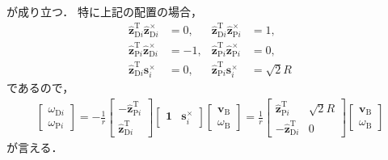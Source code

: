 ﻿\documentclass[a4paper]{jsarticle}
\begin{document}
が成り立つ．
特に上記の配置の場合，
\begin{align*}
\hat{\bm{z}}_{\mathrm{D}i}^{\mathrm{T}}\hat{\bm{z}}_{\mathrm{D}i}^{\times}&=0, &
\hat{\bm{z}}_{\mathrm{D}i}^{\mathrm{T}}\hat{\bm{z}}_{\mathrm{P}i}^{\times}&=1,
\\
\hat{\bm{z}}_{\mathrm{P}i}^{\mathrm{T}}\hat{\bm{z}}_{\mathrm{D}i}^{\times}&=-1, &
\hat{\bm{z}}_{\mathrm{P}i}^{\mathrm{T}}\hat{\bm{z}}_{\mathrm{P}i}^{\times}&=0,
\\
\hat{\bm{z}}_{\mathrm{D}i}^{\mathrm{T}}\bm{s}_{i}^{\times}&=0, &
\hat{\bm{z}}_{\mathrm{P}i}^{\mathrm{T}}\bm{s}_{i}^{\times}&=\sqrt{2}R
\end{align*}
であるので，
\begin{align*}
\begin{bmatrix}
 \omega_{\mathrm{D}i} \\ \omega_{\mathrm{P}i}
\end{bmatrix}
=
-\frac{1}{r}
\begin{bmatrix}
-\hat{\bm{z}}_{\mathrm{P}i}^{\mathrm{T}} \\
 \hat{\bm{z}}_{\mathrm{D}i}^{\mathrm{T}}
\end{bmatrix}
\begin{bmatrix}
 \bm{1} & \bm{s}_{i}^{\times}
\end{bmatrix}
\begin{bmatrix}
 \bm{v}_{\mathrm{B}} \\ \omega_{\mathrm{B}}
\end{bmatrix}
=
\frac{1}{r}
\begin{bmatrix}
 \hat{\bm{z}}_{\mathrm{P}i}^{\mathrm{T}} & \sqrt{2}R \\
-\hat{\bm{z}}_{\mathrm{D}i}^{\mathrm{T}} & 0
\end{bmatrix}
\begin{bmatrix}
 \bm{v}_{\mathrm{B}} \\ \omega_{\mathrm{B}}
\end{bmatrix}
\end{align*}
が言える．
\end{document}
